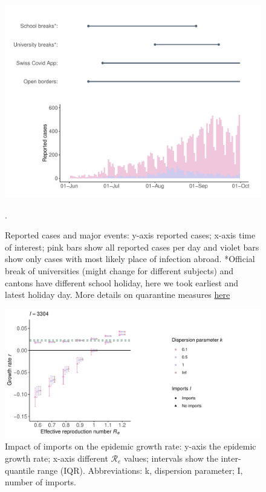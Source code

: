 \documentclass[10pt, a4paper, twoside]{article}
\begin{document}
\begin{figure}[h]
\centering
\includegraphics[scale=0.5]{regulation_cases_reported_2021-03-05.pdf}
\caption{Reported cases and major events: y-axis reported cases; x-axis time of interest; pink bars show all reported cases per day and violet bars show only cases with most likely place of infection abroad. *Official break of universities (might change for different subjects) and cantons have different school holiday, here we took earliest and latest holiday day. More details on quarantine measures  \href{https://www.fedlex.admin.ch/eli/cc/2021/61/de}{here}}.
\end{figure}
\begin{multicols}{2}

\end{multicols}
\begin{figure}[h]
\centering
\includegraphics[scale=0.5]{growth_r_imports_infect_reported_2021-02-24.pdf}
\caption{Impact of imports on the epidemic growth rate: y-axis the epidemic growth rate; x-axis different $\mathcal{R}_e$ values; intervals show the inter-quantile range (IQR). Abbreviations: k, dispersion parameter; I, number of imports.}
\end{figure}
\end{document}
